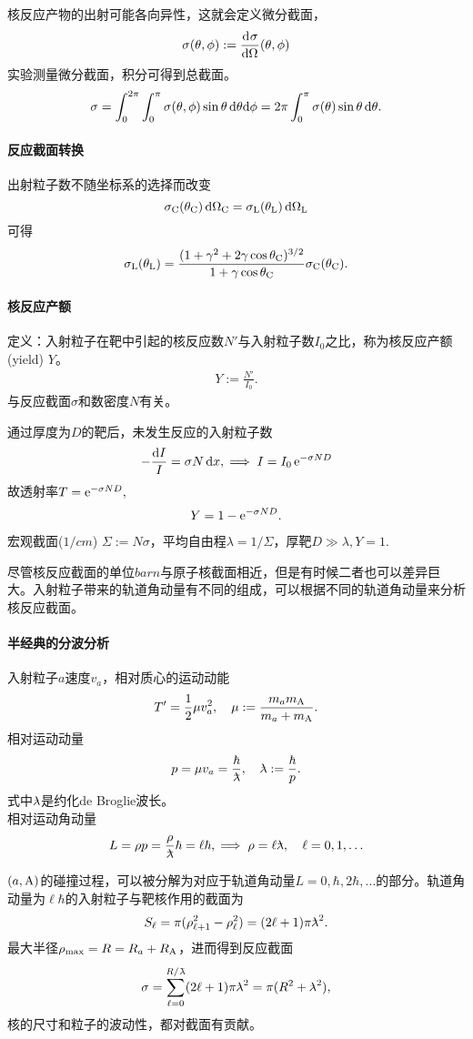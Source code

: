 核反应产物的出射可能各向异性，这就会定义微分截面，
\begin{align}
	\sigma(\theta,\phi):=\frac{\mathrm{d}^{{}}\sigma}{\mathrm{d}{\Omega}^{{}}}(\theta,\phi)
\end{align}
实验测量微分截面，积分可得到总截面。
\[
	\sigma=\int_0^{2\pi}\int_0^\pi\sigma(\theta,\phi)\sin\theta\mathop{}\!\mathrm{d}\theta\mathrm{d}\phi=2\pi\int_0^\pi\sigma(\theta)\sin\theta\mathop{}\!\mathrm{d}\theta.
\]
\paragraph{反应截面转换}出射粒子数不随坐标系的选择而改变
\[
	\sigma_{\mathrm C}(\theta_{\mathrm C})\mathop{}\!\mathrm{d}\Omega_{\mathrm C}=\sigma_{\mathrm L}(\theta_{\mathrm L})\mathop{}\!\mathrm{d}\Omega_{\mathrm L}
\]
可得
\[
	\sigma_{\mathrm L}(\theta_{\mathrm L})=\frac{(1+\gamma^2+2\gamma\cos\theta_{\mathrm C})^{3/2}}{1+\gamma\cos\theta_{\mathrm C}}\sigma_{\mathrm C}(\theta_{\mathrm C}).
\]
\paragraph{核反应产额}定义：入射粒子在靶中引起的核反应数$N'$与入射粒子数$I_0$之比，称为核反应产额(yield) $Y$。
\begin{align}
	Y:=\frac{N'}{I_0}.
\end{align}
与反应截面$\sigma$和数密度$N$有关。

通过厚度为$D$的靶后，未发生反应的入射粒子数
\[
	-\frac{\mathop{}\!\mathrm{d} I}{I}=\sigma N\mathop{}\!\mathrm{d} x,\implies I=I_0\mathop{}\!\mathrm{e}^{-\sigma ND}
\]
故透射率$T=\mathop{}\!\mathrm{e}^{-\sigma ND},$
\begin{align}
	Y=1-\mathop{}\!\mathrm{e}^{-\sigma ND}.
\end{align}
宏观截面($\si{1/cm}$) $\Sigma:=N\sigma$，平均自由程$\lambda=1/\Sigma$，厚靶$D\gg\lambda,Y=1.$

尽管核反应截面的单位$\si{barn}$与原子核截面相近，但是有时候二者也可以差异巨大。入射粒子带来的轨道角动量有不同的组成，可以根据不同的轨道角动量来分析核反应截面。

\paragraph{半经典的分波分析}入射粒子$a$速度$v_a$，相对质心的运动动能
\[
	T'=\frac12\mu v_a^2,\quad \mu:=\frac{m_am_{\mathrm{A}}}{m_a+m_{\mathrm{A}}}.
\]
相对运动动量
\[
	p=\mu v_a=\frac\hbar\barlambda,\quad\lambdabar:=\frac\hbar{p}.
\]
式中${^{_-}\!\!\!\!\lambda}$是约化de Broglie波长。\\
相对运动角动量
\[
	L=\rho p=\frac\rho\barlambda\hbar=\ell\hbar,\implies\rho=\ell\lambdabar,\quad\ell=0,1,\ldots
\]%

$(a,\mathrm{A})$的碰撞过程，可以被分解为对应于轨道角动量$L=0,\hbar,2\hbar,\ldots$的部分。轨道角动量为$\ell\hbar$的入射粒子与靶核作用的截面为
\[
	S_\ell=\pi(\rho_{\ell+1}^2-\rho_\ell^2)=(2\ell+1)\pi{^{_-}\!\!\!\!\lambda}^2.
\]
最大半径$\rho_\mathrm{max}=R=R_a+R_{\mathrm{A}}$，进而得到反应截面
\begin{align}
	\sigma=\sum_{\ell=0}^{R/\barlambda}(2\ell+1)\pi\lambdabar^2=\pi(R^2+\lambdabar^2),
\end{align}
核的尺寸和粒子的波动性，都对截面有贡献。
